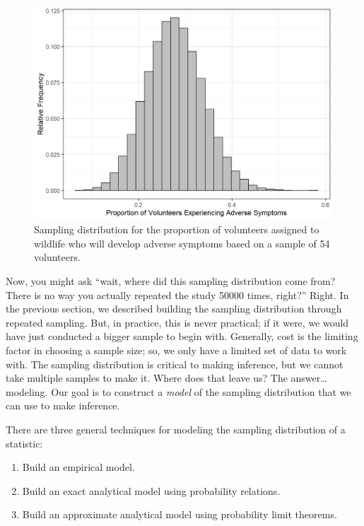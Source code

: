 \documentclass[
]{book}
\providecommand{\tightlist}{%
  \setlength{\itemsep}{0pt}\setlength{\parskip}{0pt}}
\theoremstyle{plain}
\theoremstyle{mydefn}
\theoremstyle{myexmpl}
\theoremstyle{remark}
\begin{document}
\begin{figure}

{\centering \includegraphics[width=0.8\linewidth]{./Images/samplingdistns-deepwater-histogram-1} 

}

\caption{Sampling distribution for the proportion of volunteers assigned to wildlife who will develop adverse symptoms based on a sample of 54 volunteers.}\label{fig:samplingdistns-deepwater-histogram}
\end{figure}

Now, you might ask ``wait, where did this sampling distribution come from? There is no way you actually repeated the study 50000 times, right?'' Right. In the previous section, we described building the sampling distribution through repeated sampling. But, in practice, this is never practical; if it were, we would have just conducted a bigger sample to begin with. Generally, cost is the limiting factor in choosing a sample size; so, we only have a limited set of data to work with. The sampling distribution is critical to making inference, but we cannot take multiple samples to make it. Where does that leave us? The answer\ldots modeling. Our goal is to construct a \emph{model} of the sampling distribution that we can use to make inference.

There are three general techniques for modeling the sampling distribution of a statistic:

\begin{enumerate}
\def\labelenumi{\arabic{enumi}.}
\tightlist
\item
  Build an empirical model.
\item
  Build an exact analytical model using probability relations.
\item
  Build an approximate analytical model using probability limit theorems.
\end{enumerate}
\end{document}
